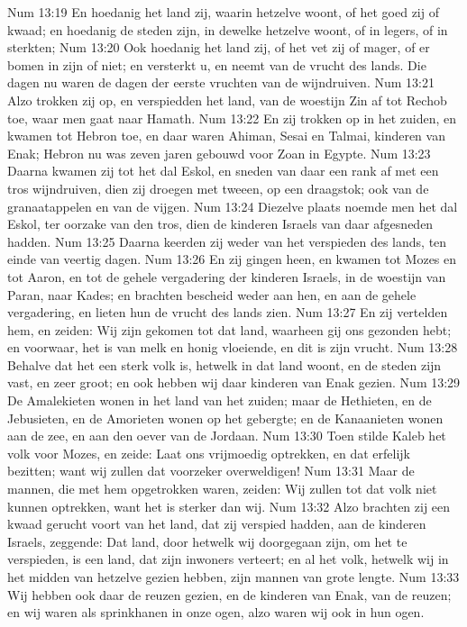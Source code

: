 Num 13:19  En hoedanig het land zij, waarin hetzelve woont, of het goed zij of kwaad; en hoedanig de steden zijn, in dewelke hetzelve woont, of in legers, of in sterkten;
Num 13:20  Ook hoedanig het land zij, of het vet zij of mager, of er bomen in zijn of niet; en versterkt u, en neemt van de vrucht des lands. Die dagen nu waren de dagen der eerste vruchten van de wijndruiven.
Num 13:21  Alzo trokken zij op, en verspiedden het land, van de woestijn Zin af tot Rechob toe, waar men gaat naar Hamath.
Num 13:22  En zij trokken op in het zuiden, en kwamen tot Hebron toe, en daar waren Ahiman, Sesai en Talmai, kinderen van Enak; Hebron nu was zeven jaren gebouwd voor Zoan in Egypte.
Num 13:23  Daarna kwamen zij tot het dal Eskol, en sneden van daar een rank af met een tros wijndruiven, dien zij droegen met tweeen, op een draagstok; ook van de granaatappelen en van de vijgen.
Num 13:24  Diezelve plaats noemde men het dal Eskol, ter oorzake van den tros, dien de kinderen Israels van daar afgesneden hadden.
Num 13:25  Daarna keerden zij weder van het verspieden des lands, ten einde van veertig dagen.
Num 13:26  En zij gingen heen, en kwamen tot Mozes en tot Aaron, en tot de gehele vergadering der kinderen Israels, in de woestijn van Paran, naar Kades; en brachten bescheid weder aan hen, en aan de gehele vergadering, en lieten hun de vrucht des lands zien.
Num 13:27  En zij vertelden hem, en zeiden: Wij zijn gekomen tot dat land, waarheen gij ons gezonden hebt; en voorwaar, het is van melk en honig vloeiende, en dit is zijn vrucht.
Num 13:28  Behalve dat het een sterk volk is, hetwelk in dat land woont, en de steden zijn vast, en zeer groot; en ook hebben wij daar kinderen van Enak gezien.
Num 13:29  De Amalekieten wonen in het land van het zuiden; maar de Hethieten, en de Jebusieten, en de Amorieten wonen op het gebergte; en de Kanaanieten wonen aan de zee, en aan den oever van de Jordaan.
Num 13:30  Toen stilde Kaleb het volk voor Mozes, en zeide: Laat ons vrijmoedig optrekken, en dat erfelijk bezitten; want wij zullen dat voorzeker overweldigen!
Num 13:31  Maar de mannen, die met hem opgetrokken waren, zeiden: Wij zullen tot dat volk niet kunnen optrekken, want het is sterker dan wij.
Num 13:32  Alzo brachten zij een kwaad gerucht voort van het land, dat zij verspied hadden, aan de kinderen Israels, zeggende: Dat land, door hetwelk wij doorgegaan zijn, om het te verspieden, is een land, dat zijn inwoners verteert; en al het volk, hetwelk wij in het midden van hetzelve gezien hebben, zijn mannen van grote lengte.
Num 13:33  Wij hebben ook daar de reuzen gezien, en de kinderen van Enak, van de reuzen; en wij waren als sprinkhanen in onze ogen, alzo waren wij ook in hun ogen.
